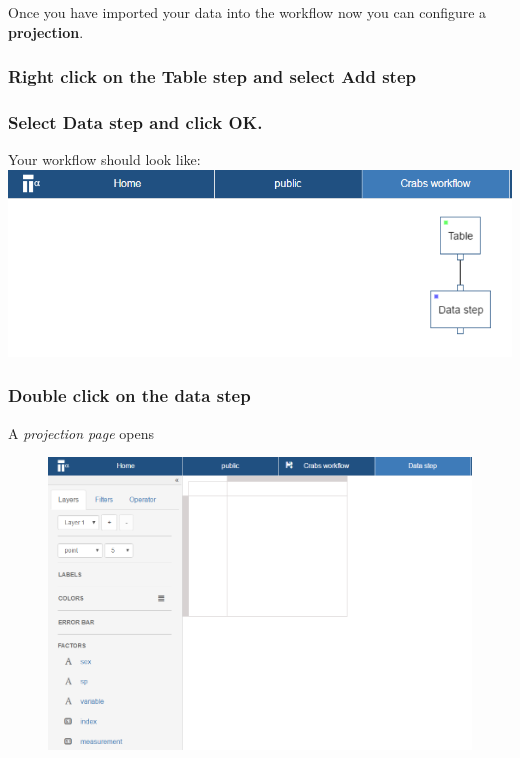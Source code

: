 \documentclass[]{book}
\theoremstyle{definition}
\theoremstyle{definition}
\theoremstyle{remark}
\begin{document}
Once you have imported your data into the workflow now you can configure
a \textbf{projection}.

\subsubsection{\texorpdfstring{Right click on the Table step and select
\textbf{Add
step}}{Right click on the Table step and select Add step}}\label{right-click-on-the-table-step-and-select-add-step}

\subsubsection{\texorpdfstring{Select \textbf{Data step} and click
\textbf{OK}.}{Select Data step and click OK.}}\label{select-data-step-and-click-ok.}

Your workflow should look like:
\includegraphics{images/demo_table_data.png}

\subsubsection{Double click on the data
step}\label{double-click-on-the-data-step}

A \emph{projection page} opens

\begin{figure}[htbp]
\centering
\includegraphics{images/projection.png}
\caption{}
\end{figure}
\end{document}
